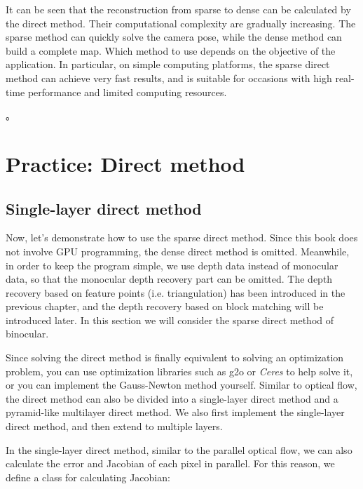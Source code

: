 It can be seen that the reconstruction from sparse to dense can be calculated by the direct method. Their computational complexity are gradually increasing. The sparse method can quickly solve the camera pose, while the dense method can build a complete map. Which method to use depends on the objective of the application. In particular, on simple computing platforms, the sparse direct method can achieve very fast results, and is suitable for occasions with high real-time performance and limited computing resources.

\textsuperscript{\cite{Engel2016}}。

\section{Practice: Direct method}
\subsection{Single-layer direct method}
Now, let's demonstrate how to use the sparse direct method. Since this book does not involve GPU programming, the dense direct method is omitted. Meanwhile, in order to keep the program simple, we use depth data instead of monocular data, so that the monocular depth recovery part can be omitted. The depth recovery based on feature points (i.e. triangulation) has been introduced in the previous chapter, and the depth recovery based on block matching will be introduced later. In this section we will consider the sparse direct method of binocular.

Since solving the direct method is finally equivalent to solving an optimization problem, you can use optimization libraries such as g2o or \textit{Ceres} to help solve it, or you can implement the Gauss-Newton method yourself. Similar to optical flow, the direct method can also be divided into a single-layer direct method and a pyramid-like multilayer direct method. We also first implement the single-layer direct method, and then extend to multiple layers.

In the single-layer direct method, similar to the parallel optical flow, we can also calculate the error and Jacobian of each pixel in parallel. For this reason, we define a class for calculating Jacobian:

